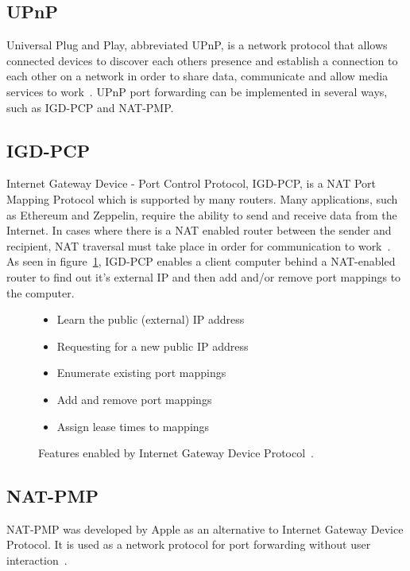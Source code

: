 \subsection{UPnP}
Universal Plug and Play, abbreviated UPnP, is a network protocol that allows connected devices to discover each others presence and establish a connection to each other on a network in order to share data, communicate and allow media services to work~\cite{kurose:p352}. UPnP port forwarding can be implemented in several ways, such as IGD-PCP and NAT-PMP.

\subsection{IGD-PCP}
Internet Gateway Device - Port Control Protocol, IGD-PCP, is a NAT Port Mapping Protocol which is supported by many routers. Many applications, such as Ethereum and Zeppelin, require the ability to send and receive data from the Internet. In cases where there is a NAT enabled router between the sender and recipient, NAT traversal must take place in order for communication to work~\cite{igd-pcp:rfc}. As seen in figure~\ref{fig:igd}, IGD-PCP enables a client computer behind a NAT-enabled router to find out it's external IP and then add and/or remove port mappings to the computer. 

\begin{figure}[H]
\centering
\begin{itemize}
    \item Learn the public (external) IP address
    \item Requesting for a new public IP address
    \item Enumerate existing port mappings
    \item Add and remove port mappings
    \item Assign lease times to mappings
\end{itemize}
\caption{Features enabled by Internet Gateway Device Protocol~\cite{igd-pcp:rfc}.}
\label{fig:igd}
\end{figure}

\subsection{NAT-PMP}
NAT-PMP was developed by Apple as an alternative to Internet Gateway Device Protocol. It is used as a network protocol for port forwarding without user interaction~\cite{nat-pmp:rfc}.